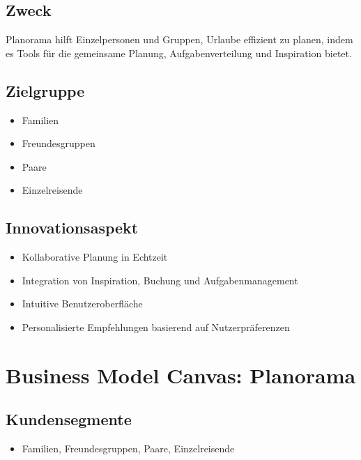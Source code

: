 \documentclass{article}
\begin{document}
\subsection{Zweck}\label{zweck}

Planorama hilft Einzelpersonen und Gruppen, Urlaube effizient zu planen,
indem es Tools für die gemeinsame Planung, Aufgabenverteilung und
Inspiration bietet.

\subsection{Zielgruppe}\label{zielgruppe}

\begin{itemize}
\tightlist
\item
  Familien
\item
  Freundesgruppen
\item
  Paare
\item
  Einzelreisende
\end{itemize}

\subsection{Innovationsaspekt}\label{innovationsaspekt}

\begin{itemize}
\tightlist
\item
  Kollaborative Planung in Echtzeit
\item
  Integration von Inspiration, Buchung und Aufgabenmanagement
\item
  Intuitive Benutzeroberfläche
\item
  Personalisierte Empfehlungen basierend auf Nutzerpräferenzen
\end{itemize}

\newpage

\section{Business Model Canvas:
Planorama}\label{business-model-canvas-planorama}

\subsection{Kundensegmente}\label{kundensegmente}

\begin{itemize}
\tightlist
\item
  Familien, Freundesgruppen, Paare, Einzelreisende
\end{itemize}
\end{document}
